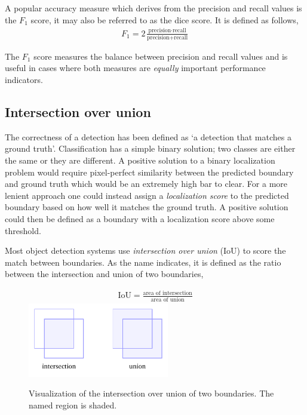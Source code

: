 A popular accuracy measure which derives from the precision and recall values is the \(F_1\) score, it may also be referred to as the dice score.
It is defined as follows,
%
\begin{align*}
  F_1=2\frac{\text{precision}\cdot\text{recall}}{\text{precision}+\text{recall}}
\end{align*}

The \(F_1\) score measures the balance between precision and recall values and is useful in cases where both measures are \textit{equally} important performance indicators.

\subsection{Intersection over union}
The correctness of a detection has been defined as `a detection that matches a ground truth'.
Classification has a simple binary solution; two classes are either the same or they are different.
A positive solution to a binary localization problem would require pixel-perfect similarity between the predicted boundary and ground truth which would be an extremely high bar to clear.
For a more lenient approach one could instead assign a \textit{localization score} to the predicted boundary based on how well it matches the ground truth.
A positive solution could then be defined as a boundary with a localization score above some threshold.

Most object detection systems use \textit{intersection over union} (IoU) to score the match between boundaries.
As the name indicates, it is defined as the ratio between the intersection and union of two boundaries,

\begin{figure}[htb]
  \centering
  \begin{gather*}
    \text{IoU}=\frac{\text{area of intersection}}{\text{area of union}}
  \end{gather*}
  \includegraphics[width=0.55\textwidth]{figs/background/iou.pdf}
\caption[Intersection over union]{Visualization of the intersection over union of two boundaries.
The named region is shaded.}\label{fig:iou}
\end{figure}

